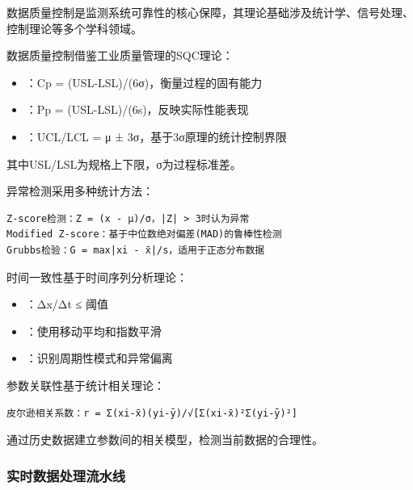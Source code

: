 
数据质量控制是监测系统可靠性的核心保障，其理论基础涉及统计学、信号处理、控制理论等多个学科领域。


数据质量控制借鉴工业质量管理的SQC理论：

\begin{itemize}
\tightlist
\item
  ：Cp = (USL-LSL)/(6σ)，衡量过程的固有能力
\item
  ：Pp = (USL-LSL)/(6s)，反映实际性能表现
\item
  ：UCL/LCL = μ ± 3σ，基于3σ原理的统计控制界限
\end{itemize}

其中USL/LSL为规格上下限，σ为过程标准差。


异常检测采用多种统计方法：

\begin{lstlisting}
Z-score检测：Z = (x - μ)/σ，|Z| > 3时认为异常
Modified Z-score：基于中位数绝对偏差(MAD)的鲁棒性检测
Grubbs检验：G = max|xi - x̄|/s，适用于正态分布数据
\end{lstlisting}


时间一致性基于时间序列分析理论：

\begin{itemize}
\tightlist
\item
  ：\textbar Δx/Δt\textbar{} ≤ 阈值
\item
  ：使用移动平均和指数平滑
\item
  ：识别周期性模式和异常偏离
\end{itemize}


参数关联性基于统计相关理论：

\begin{lstlisting}
皮尔逊相关系数：r = Σ(xi-x̄)(yi-ȳ)/√[Σ(xi-x̄)²Σ(yi-ȳ)²]
\end{lstlisting}

通过历史数据建立参数间的相关模型，检测当前数据的合理性。

\hypertarget{ux5b9eux65f6ux6570ux636eux5904ux7406ux6d41ux6c34ux7ebf}{%
\subsubsection{实时数据处理流水线}\label{ux5b9eux65f6ux6570ux636eux5904ux7406ux6d41ux6c34ux7ebf}}

